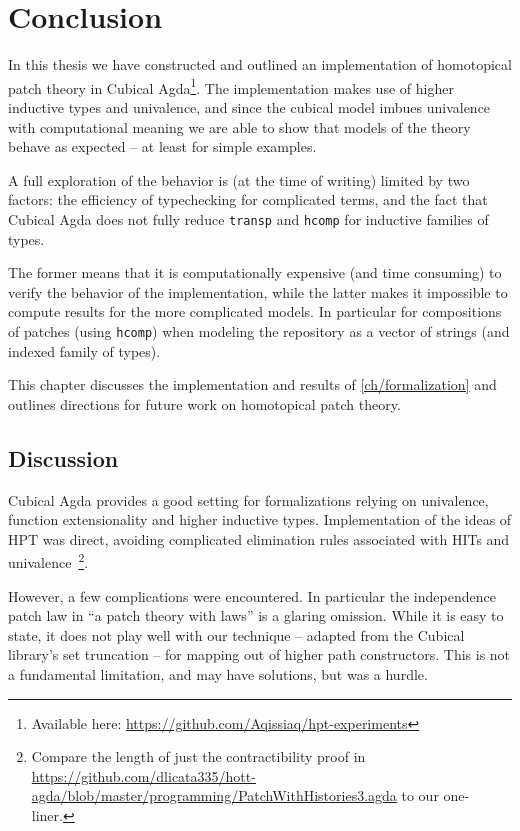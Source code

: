 \chapter{Conclusion}\label{ch/conclusion}

In this thesis we have constructed and outlined an implementation of homotopical
patch theory in Cubical Agda\footnote{Available here:
  \url{https://github.com/Aqissiaq/hpt-experiments}}.
The implementation makes use of higher inductive
types and univalence, and since the cubical model imbues univalence with
computational meaning we are able to show that models of the theory behave as
expected -- at least for simple examples.

A full exploration of the behavior is (at the time of writing) limited by two
factors: the efficiency of typechecking for complicated terms, and the fact that
Cubical Agda does not fully reduce \texttt{transp} and \texttt{hcomp} for
inductive families of types.

The former means that it is computationally expensive (and time consuming) to
verify the behavior of the implementation, while the latter makes it impossible
to compute results for the more complicated models. In particular for
compositions of patches (using \texttt{hcomp}) when modeling the repository as a
vector of strings (and indexed family of types).

This chapter discusses the implementation and results of
\autoref{ch/formalization} and outlines directions for future work on homotopical
patch theory.

\section{Discussion}
Cubical Agda provides a good setting for formalizations relying on univalence,
function extensionality and higher inductive types. Implementation of the
ideas of HPT was direct, avoiding complicated elimination rules associated with
HITs and univalence~\footnote{Compare the length of just the contractibility
proof in \url{https://github.com/dlicata335/hott-agda/blob/master/programming/PatchWithHistories3.agda}
to our one-liner.}.

However, a few complications were encountered. In particular the independence
patch law in ``a patch theory with laws'' is a glaring omission. While it is
easy to state, it does not play well with our technique -- adapted from the Cubical library's set
truncation -- for mapping out of higher path constructors. This is not a
fundamental limitation, and may have solutions, but was a hurdle.

